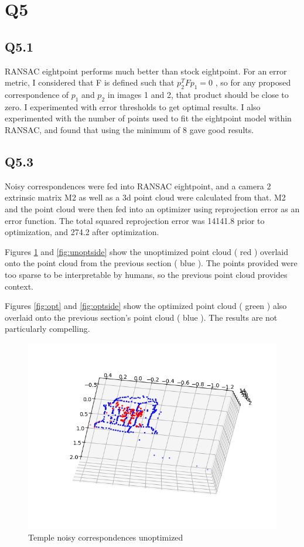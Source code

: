 \documentclass[12pt]{article}
\begin{document}
\newpage
\section{Q5}
\subsection{Q5.1}
RANSAC eightpoint performs much better than stock eightpoint. For an error metric, I considered that F is defined such that $p_{2}^{T} F p_{1} = 0$ , so for any proposed correspondence of $p_{1}$ and $p_{2}$ in images 1 and 2, that product should be close to zero. I experimented with error thresholds to get optimal results. I also experimented with the number of points used to fit the eightpoint model within RANSAC, and found that using the minimum of 8 gave good results.


\newpage
\subsection{Q5.3}
Noisy correspondences were fed into RANSAC eightpoint, and a camera 2 extrinsic matrix M2 as well as a 3d point cloud were calculated from that. M2 and the point cloud were then fed into an optimizer using reprojection error as an error function. The total squared reprojection error was 14141.8 prior to optimization, and 274.2 after optimization.  
    
Figures \ref{fig:unopt} and \ref{fig:unoptside} show the unoptimized point cloud ( red ) overlaid onto the point cloud from the previous section ( blue  ). The points provided were too sparse to be interpretable by humans, so the previous point cloud provides context.

Figures \ref{fig:opt} and \ref{fig:optside} show the optimized point cloud ( green ) also overlaid onto the previous section's point cloud ( blue ). The results are not particularly compelling.

\begin{figure}[H]
\centering
\includegraphics[page=1,width=1\textwidth]{q5_3a}
\caption{Temple noisy correspondences unoptimized   } 
\label{fig:unopt}
\end{figure}   
\end{document}
